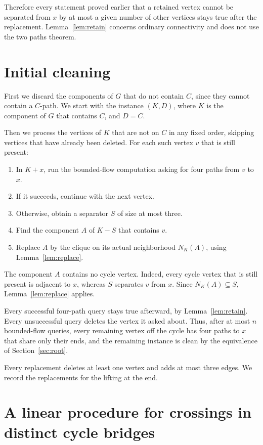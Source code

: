 \documentclass[11pt]{article}
\begin{document}
Therefore every statement proved earlier that a retained vertex cannot be
separated from $x$ by at most a given number of other vertices stays true
after the replacement. Lemma~\ref{lem:retain} concerns ordinary connectivity
and does not use the two paths theorem.

\section{Initial cleaning}\label{sec:clean}

First we discard the components of $G$ that do not contain $C$, since they
cannot contain a $C$-path. We start with the instance $(K,D)$, where $K$ is the
component of $G$ that contains $C$, and $D=C$.

Then we process the vertices of $K$ that are not on $C$ in any fixed order,
skipping vertices that have already been deleted. For each such vertex $v$
that is still present:
\begin{enumerate}[nosep]
\item In $K+x$, run the bounded-flow computation asking for four paths from
$v$ to $x$.
\item If it succeeds, continue with the next vertex.
\item Otherwise, obtain a separator $S$ of size at most three.
\item Find the component $A$ of $K-S$ that contains $v$.
\item Replace $A$ by the clique on its actual neighborhood $N_K(A)$, using
Lemma~\ref{lem:replace}.
\end{enumerate}

The component $A$ contains no cycle vertex. Indeed, every cycle vertex that is
still present is adjacent to $x$, whereas $S$ separates $v$ from $x$. Since
$N_K(A)\subseteq S$, Lemma~\ref{lem:replace} applies.

Every successful four-path query stays true afterward, by
Lemma~\ref{lem:retain}. Every unsuccessful query deletes the vertex it asked
about. Thus, after at most $n$ bounded-flow queries, every remaining vertex off
the cycle has four paths to $x$ that share only their ends, and the remaining
instance is clean by the equivalence of Section~\ref{sec:root}.

Every replacement deletes at least one vertex and adds at most three edges. We
record the replacements for the lifting at the end.

\section{A linear procedure for crossings in distinct cycle bridges}\label{sec:bridges}
\end{document}
